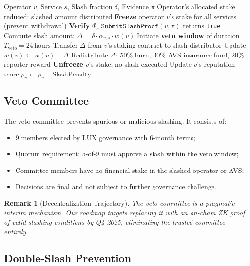 \documentclass[11pt]{article}
\newtheorem{remark}{Remark}
\begin{document}
\begin{algorithm}[H]
\caption{LRP Slashing Protocol}
\label{alg:slash}
\begin{algorithmic}[1]
\Require Operator $v$, Service $s$, Slash fraction $\delta$, Evidence $\pi$
\Ensure Operator's allocated stake reduced; slashed amount distributed
\State \textbf{Freeze} operator $v$'s stake for all services (prevent withdrawal)
\State \textbf{Verify} $\Phi_s.\texttt{SubmitSlashProof}(v, \pi)$ returns \texttt{true}
\State Compute slash amount: $\Delta = \delta \cdot \alpha_{v,s} \cdot w(v)$
\State Initiate \textbf{veto window} of duration $T_{\text{veto}} = 24\,\text{hours}$
  \State Transfer $\Delta$ from $v$'s staking contract to slash distributor
  \State Update $w(v) \leftarrow w(v) - \Delta$
  \State Redistribute $\Delta$: 50\% burn, 30\% AVS insurance fund, 20\% reporter reward
\Else
  \State \textbf{Unfreeze} $v$'s stake; no slash executed
\EndIf
\State Update $v$'s reputation score $\rho_v \leftarrow \rho_v - \text{SlashPenalty}$
\end{algorithmic}
\end{algorithm}

\subsection{Veto Committee}

The veto committee prevents spurious or malicious slashing. It consists of:

\begin{itemize}[leftmargin=1.5em]
  \item 9 members elected by LUX governance with 6-month terms;
  \item Quorum requirement: 5-of-9 must approve a slash within the veto window;
  \item Committee members have no financial stake in the slashed operator or AVS;
  \item Decisions are final and not subject to further governance challenge.
\end{itemize}

\begin{remark}[Decentralization Trajectory]
The veto committee is a pragmatic interim mechanism. Our roadmap targets replacing it with
an on-chain ZK proof of valid slashing conditions by Q4 2025, eliminating the trusted
committee entirely.
\end{remark}

\subsection{Double-Slash Prevention}
\end{document}
